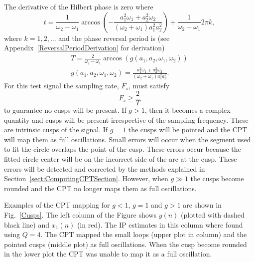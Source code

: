 \documentclass[11pt,draftcls,onecolumn]{IEEEtran}
\begin{document}
The derivative of the Hilbert phase is zero where
\begin{equation}\label{StationaryPhaseTimes}
    t=\frac{1}{\omega_2-\omega_1}\arccos\left(-\frac{a_1^2\omega_1 + a_2^2\omega_2}{(\omega_2 +
    \omega_1)a_1^2a_2^2}\right)+\frac{1}{\omega_2-\omega_1}2\pi k,
\end{equation}
where $k=1,2,...$ and the phase reversal period is (see Appendix~\ref{ReversalPeriodDerivation} for derivation) 
\begin{eqnarray}\label{PhaseReversalPeriod}
    T=\frac{2}{\omega_2-\omega_1}\arccos\left(g\left(a_1,a_2,\omega_1,\omega_2\right)\right) \\ 
g\left(a_1,a_2,\omega_1,\omega_2\right) = \frac{a_1^2\omega_1 + a_2^2\omega_2}{(\omega_2 +
    \omega_1)a_1^2a_2^2}.
\end{eqnarray}
For this test signal the sampling rate, $F_s$, must satisfy
\begin{equation}
    F_s \ge \frac{2}{T}
\end{equation}
to guarantee no cusps will be present. If $g>1$, then it becomes a complex quantity and cusps will be present irrespective of the sampling frequency. These are intrinsic cusps of the signal. If $g=1$ the cusps will be pointed and the CPT will map them as full oscillations. Small errors will occur when the segment used to fit the circle overlaps the point of the cusp. These errors occur because the fitted circle center will be on the incorrect side of the arc at the cusp. These errors will be detected and corrected by the methods explained in Section~\ref{sect:ComputingCPTSection}. However, when $g \gg 1$ the cusps become rounded and the CPT no longer maps them as full oscillations. 

Examples of the CPT mapping for $g<1$, $g=1$ and $g>1$ are shown in Fig.~\ref{Cusps}. The left column of the Figure shows $y(n)$ (plotted with dashed black line) and $x_1(n)$ (in red). The IP estimates in this column where found using $Q=4$. The CPT mapped the small loops (upper plot in column) and the pointed cusps (middle plot) as full oscillations. When the cusp become rounded in the lower plot the CPT was unable to map it as a full oscillation. 
\end{document}
